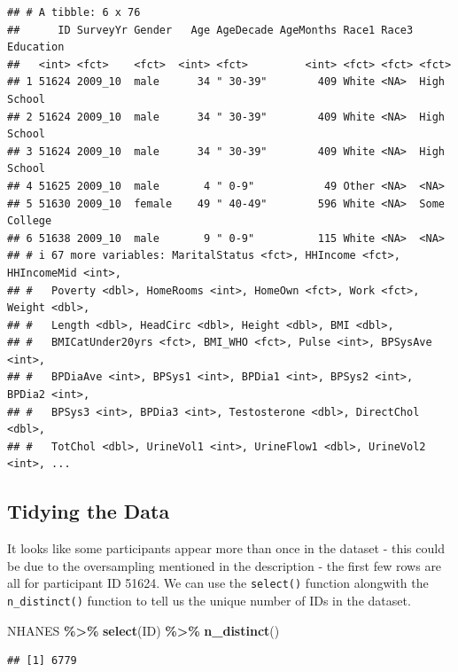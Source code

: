 \documentclass[
]{book}
\newenvironment{Shaded}{\begin{snugshade}}{\end{snugshade}}
\newcommand{\FunctionTok}[1]{\textcolor[rgb]{0.13,0.29,0.53}{\textbf{#1}}}
\newcommand{\NormalTok}[1]{#1}
\newcommand{\SpecialCharTok}[1]{\textcolor[rgb]{0.81,0.36,0.00}{\textbf{#1}}}
\begin{document}
\begin{verbatim}
## # A tibble: 6 x 76
##      ID SurveyYr Gender   Age AgeDecade AgeMonths Race1 Race3 Education   
##   <int> <fct>    <fct>  <int> <fct>         <int> <fct> <fct> <fct>       
## 1 51624 2009_10  male      34 " 30-39"        409 White <NA>  High School 
## 2 51624 2009_10  male      34 " 30-39"        409 White <NA>  High School 
## 3 51624 2009_10  male      34 " 30-39"        409 White <NA>  High School 
## 4 51625 2009_10  male       4 " 0-9"           49 Other <NA>  <NA>        
## 5 51630 2009_10  female    49 " 40-49"        596 White <NA>  Some College
## 6 51638 2009_10  male       9 " 0-9"          115 White <NA>  <NA>        
## # i 67 more variables: MaritalStatus <fct>, HHIncome <fct>, HHIncomeMid <int>,
## #   Poverty <dbl>, HomeRooms <int>, HomeOwn <fct>, Work <fct>, Weight <dbl>,
## #   Length <dbl>, HeadCirc <dbl>, Height <dbl>, BMI <dbl>,
## #   BMICatUnder20yrs <fct>, BMI_WHO <fct>, Pulse <int>, BPSysAve <int>,
## #   BPDiaAve <int>, BPSys1 <int>, BPDia1 <int>, BPSys2 <int>, BPDia2 <int>,
## #   BPSys3 <int>, BPDia3 <int>, Testosterone <dbl>, DirectChol <dbl>,
## #   TotChol <dbl>, UrineVol1 <int>, UrineFlow1 <dbl>, UrineVol2 <int>, ...
\end{verbatim}

\hypertarget{tidying-the-data}{%
\subsection{Tidying the Data}\label{tidying-the-data}}

It looks like some participants appear more than once in the dataset - this could be due to the oversampling mentioned in the description - the first few rows are all for participant ID 51624. We can use the \texttt{select()} function alongwith the \texttt{n\_distinct()} function to tell us the unique number of IDs in the dataset.

\begin{Shaded}
\begin{Highlighting}[]
\NormalTok{NHANES }\SpecialCharTok{\%\textgreater{}\%} 
  \FunctionTok{select}\NormalTok{(ID) }\SpecialCharTok{\%\textgreater{}\%} 
  \FunctionTok{n\_distinct}\NormalTok{()}
\end{Highlighting}
\end{Shaded}

\begin{verbatim}
## [1] 6779
\end{verbatim}
\end{document}
